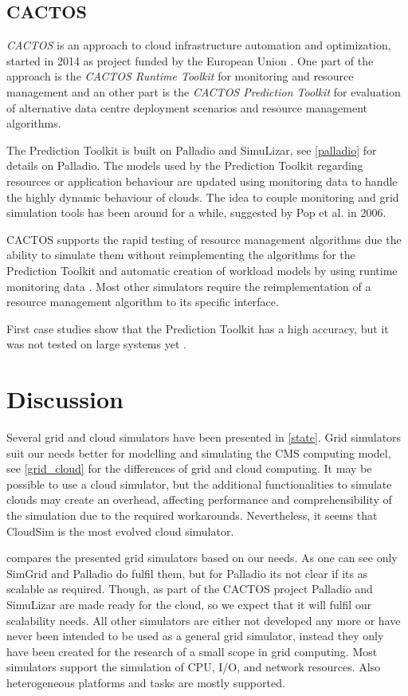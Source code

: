 \section{CACTOS}
\textit{CACTOS} is an approach to cloud infrastructure automation and optimization, started in 2014 as project funded by the European Union \cite{cactos}.
One part of the approach is the \textit{CACTOS Runtime Toolkit} for monitoring and resource management and an other part is the \textit{CACTOS Prediction Toolkit} for evaluation of alternative data centre deployment scenarios and resource management algorithms.

The Prediction Toolkit is built on Palladio and SimuLizar, see \cref{palladio} for details on Palladio.
The models used by the Prediction Toolkit regarding resources or application behaviour are updated using monitoring data to handle the highly dynamic behaviour of clouds.
The idea to couple monitoring and grid simulation tools has been around for a while, suggested by Pop et al. \cite{1698650} in 2006.

CACTOS supports the rapid testing of resource management algorithms due the ability to simulate them without reimplementing the algorithms for the Prediction Toolkit and automatic creation of workload models by using runtime monitoring data \cite{rapidtesting}. Most other simulators require the reimplementation of a resource management algorithm to its specific interface.

First case studies show that the Prediction Toolkit has a high accuracy, but it was not tested on large systems yet \cite{rapidtesting}.

\chapter{Discussion}
\label{dis}
Several grid and cloud simulators have been presented in \cref{state}. Grid simulators suit our needs better for modelling and simulating the CMS computing model, see \cref{grid_cloud} for the differences of grid and cloud computing. It may be possible to use a cloud simulator, but the additional functionalities to simulate clouds may create an overhead, affecting performance and comprehensibility of the simulation due to the required workarounds. Nevertheless, it seems that CloudSim is the most evolved cloud simulator.

 compares the presented grid simulators based on our needs. As one can see only SimGrid and Palladio do fulfil them, but for Palladio its not clear if its as scalable as required. Though, as part of the CACTOS project Palladio and SimuLizar are made ready for the cloud, so we expect that it will fulfil our scalability needs. All other simulators are either not developed any more or have never been intended to be used as a general grid simulator, instead they only have been created for the research of a small scope in grid computing. Most simulators support the simulation of CPU, I/O, and network resources. Also heterogeneous platforms and tasks are mostly supported.

